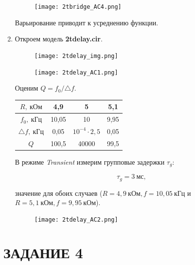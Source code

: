 \documentclass[a4paper, 12pt]{article}%
\begin{document}
\begin{enumerate}
\begin{figure}[h!]
\centering
\texttt{[image: 2tbridge\_AC4.png]}
\label{fig:Image1}
\end{figure}

Варьирование приводит к усреднению функции.

\item Откроем модель \textbf{2tdelay.cir}.

\begin{figure}[h!]
\centering
\texttt{[image: 2tdelay\_img.png]}
\label{fig:Image1}
\end{figure}

\begin{figure}[h!]
\centering
\texttt{[image: 2tdelay\_AC1.png]}
\label{fig:Image1}
\end{figure}

Оценим $Q = f_0/\triangle f$.

\begin{center}
\begin{tabular}{|c|c|c|c|}
\hline
$R, \: \textit{кОм}$ & 4,9 & 5 & 5,1 \\
\hline
$f_0, \: \textit{кГц}$ & 10,05 & 10 & 9,95 \\
\hline
$\triangle f, \: \textit{кГц}$ & 0,05 & $10^{-4}\cdot 2,5$ & 0,05 \\
\hline
$Q$ & 100,5 & 40000 & 99,5 \\
\hline
\end{tabular}
\end{center}

В режиме \textit{Transient} измерим групповые задержки $\tau_g$:

\[\tau_g = 3 \: \textit{мс},\]

значение для обоих случаев ($R = 4,9 \: \textit{кОм}, f = 10,05 \: \textit{кГц}$ и $R = 5,1 \: \textit{кОм}, f = 9,95 \: \textit{кОм}$).

\begin{figure}[h!]
\centering
\texttt{[image: 2tdelay\_AC2.png]}
\label{fig:Image1}
\end{figure}

\end{enumerate}

\section*{ЗАДАНИЕ 4}
\end{document}
